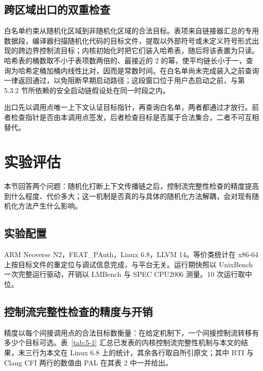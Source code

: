 \subsection{跨区域出口的双重检查}

白名单约束从随机化区域到非随机化区域的合法目标。表项来自链接器汇总的专用数据段，编译器扫描随机化代码的目标文件，提取以外部符号或未定义符号形式出现的跨边界控制流目标；内核初始化时把它们装入哈希表，随后将该表置为只读。哈希表的桶数取不小于表项数两倍的、最接近的 2 的幂，使平均链长小于一，查询为哈希定桶加桶内线性比对，因而是常数时间。在白名单尚未完成装入之前查询一律返回通过，以免阻断早期启动路径；这段窗口位于用户态启动之前，与第 5.3.2 节所依赖的安全启动链假设处在同一时段之内。

出口先以调用点唯一上下文认证目标指针，再查询白名单，两者都通过才放行。前者检查指针是否由本调用点签发，后者检查目标是否属于合法集合，二者不可互相替代。

\section{实验评估}

本节回答两个问题：随机化打断上下文传播链之后，控制流完整性检查的精度提高到什么程度、代价多大；这一机制是否真的与具体的随机化方法解耦，会对现有随机化方法产生什么影响。

\subsection{实验配置}

ARM Neoverse N2，FEAT\_PAuth，Linux 6.8，LLVM 14。等价类统计在 x86-64 上按目标文件的重定位与调试信息完成，与平台无关。运行期快照以 UnixBench 一次完整运行驱动，开销以 LMBench 与 SPEC CPU2006 测量。10 次运行取中位。

\subsection{控制流完整性检查的精度与开销}

精度以每个间接调用点的合法目标数衡量：在给定机制下，一个间接控制流转移有多少个目标可选。表~\ref{tab:5-1} 汇总已发表的内核控制流完整性机制与本文的结果，末三行为本文在 Linux 6.8 上的统计，其余各行取自所引原文；其中 BTI 与 Clang CFI 两行的数值由 PAL 在其表 2 中一并给出。

